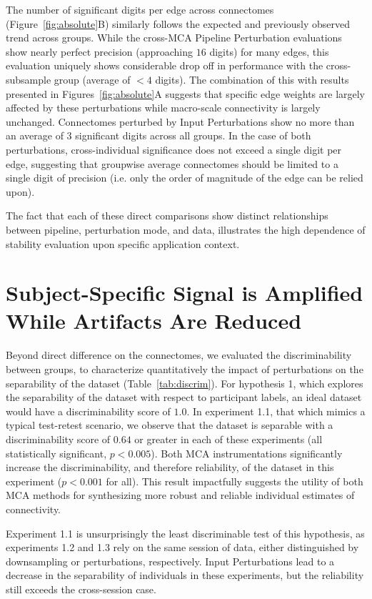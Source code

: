 \documentclass[fleqn,10pt]{SelfArx} %
\begin{document}
The number of significant digits per edge across connectomes (Figure~\ref{fig:absolute}B) similarly follows the
expected and previously observed trend across groups. While the cross-MCA Pipeline Perturbation evaluations show nearly
perfect precision (approaching $16$ digits) for many edges, this evaluation uniquely shows considerable drop off in
performance with the cross-subsample group (average of $< 4$ digits). The combination of this with results presented in
Figures~\ref{fig:absolute}A suggests that specific edge weights are largely affected by these perturbations while
macro-scale connectivity is largely unchanged. Connectomes perturbed by Input Perturbations show no more than an
average of $3$ significant digits across all groups. In the case of both perturbations, cross-individual significance
does not exceed a single digit per edge, suggesting that groupwise average connectomes should be limited to a single
digit of precision (i.e. only the order of magnitude of the edge can be relied upon).

The fact that each of these direct comparisons show distinct relationships between pipeline, perturbation mode, and
data, illustrates the high dependence of stability evaluation upon specific application context.

\section*{Subject-Specific Signal is Amplified While Artifacts Are Reduced}

Beyond direct difference on the connectomes, we evaluated the discriminability between groups, to characterize
quantitatively the impact of perturbations on the separability of the dataset (Table~\ref{tab:discrim}). For
hypothesis 1, which explores the separability of the dataset with respect to participant labels, an ideal dataset would
have a discriminability score of $1.0$. In experiment 1.1, that which mimics a typical test-retest scenario, we observe
that the dataset is separable with a discriminability score of $0.64$ or greater in each of these experiments (all
statistically significant, $p < 0.005$). Both MCA instrumentations significantly increase the discriminability, and
therefore reliability, of the dataset in this experiment ($p < 0.001$ for all). This result impactfully suggests the
utility of both MCA methods for synthesizing more robust and reliable individual estimates of connectivity.

Experiment 1.1 is unsurprisingly the least discriminable test of this hypothesis, as experiments 1.2 and 1.3 rely on
the same session of data, either distinguished by downsampling or perturbations, respectively. Input Perturbations lead
to a decrease in the separability of individuals in these experiments, but the reliability still exceeds the
cross-session case.
\end{document}
